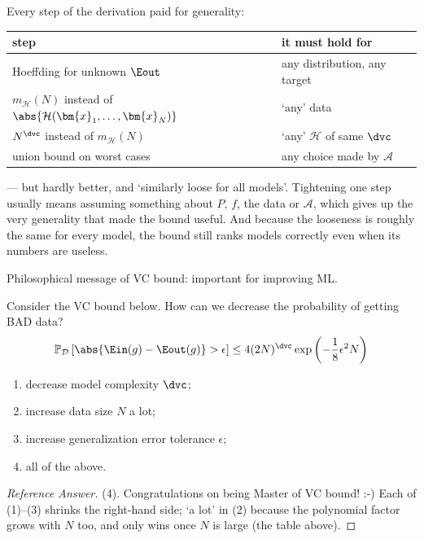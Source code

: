 Every step of the derivation paid for generality:

\begin{center}
    \solidrules
    \begin{tabular}{@{}l|l@{}}
        \toprule
        step & it must hold for\\
        \midrule
        Hoeffding for unknown \(\Eout\) & any distribution, any target\\
        \(m_{\mathcal{H}}(N)\) instead of \(\abs{\mathcal{H}(\bm{x}_1, \dots ,
        \bm{x}_N)}\) & `any' data\\
        \(N^{\dvc}\) instead of \(m_{\mathcal{H}}(N)\) & `any' \(\mathcal{H}\) of
        same \(\dvc\)\\
        union bound on worst cases & any choice made by \(\mathcal{A}\)\\
        \bottomrule
    \end{tabular}
\end{center}

--- but hardly better, and `similarly loose for all models'. Tightening one
step usually means assuming something about \(P\), \(f\), the data or
\(\mathcal{A}\), which gives up the very generality that made the bound useful.
And because the looseness is roughly the same for every model, the bound still
ranks models correctly even when its numbers are useless.

\begin{moral}
    Philosophical message of VC bound: important for improving ML.
\end{moral}

\begin{exercise}
    Consider the VC bound below. How can we decrease the probability of getting
    BAD data?
    \[
        \mathbb{P}_{\mathcal{D}}\left[ \abs{\Ein(g) - \Eout(g)} > \epsilon
        \right]
        \le 4 (2N)^{\dvc} \exp \left( -\frac{1}{8} \epsilon^2 N \right)
    \]
    \begin{enumerate}[(1)]
        \item decrease model complexity \(\dvc\);
        \item increase data size \(N\) a lot;
        \item increase generalization error tolerance \(\epsilon\);
        \item all of the above.
    \end{enumerate}
\end{exercise}

\begin{proof}[Reference Answer]
    (4). Congratulations on being Master of VC bound! :-) Each of (1)--(3)
    shrinks the right-hand side; `a lot' in (2) because the polynomial factor
    grows with \(N\) too, and only wins once \(N\) is large (the table above).
\end{proof}


